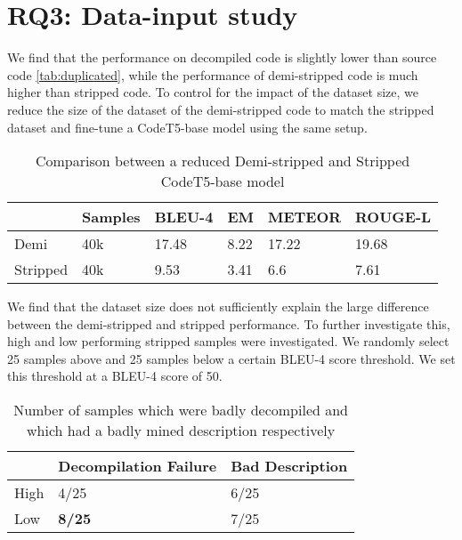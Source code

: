 
\section{RQ3: Data-input study}
We find that the performance on decompiled code is slightly lower than source code \ref{tab:duplicated}, while the performance of demi-stripped code is much higher than stripped code. To control for the impact of the dataset size, we reduce the size of the dataset of the demi-stripped code to match the stripped dataset and fine-tune a CodeT5-base model using the same setup.
\label{tab:demiSize}
\begin{table}[!h]
\centering
\begin{tabular}{llllll} 
\hline
\rowcolor[rgb]{0.729,0.729,0.729} \multicolumn{1}{|l}{\textbf{}} & Samples & BLEU-4 & EM   & METEOR & \multicolumn{1}{l|}{ROUGE-L}  \\ 
\hline
Demi                                                             & 40k     & 17.48  & 8.22 & 17.22  &  19.68                             \\
Stripped                                                         & 40k     & 9.53   & 3.41 & 6.6  &  7.61                            
\end{tabular}
\caption{Comparison between a reduced Demi-stripped and Stripped CodeT5-base model}
\end{table}

We find that the dataset size does not sufficiently explain the large difference between the demi-stripped and stripped performance. To further investigate this, high and low performing stripped samples were investigated. We randomly select 25 samples above and 25 samples below a certain BLEU-4 score threshold. We set this threshold at a BLEU-4 score of 50.

\label{tab:manual}
\begin{table}[!h]
\centering
\begin{tabular}{lll}
\hline
\rowcolor[HTML]{C0C0C0} 
\multicolumn{1}{|l}{\cellcolor[HTML]{C0C0C0}\textbf{}} & Decompilation Failure & \multicolumn{1}{l|}{\cellcolor[HTML]{C0C0C0}Bad Description} \\ \hline
High                                                   & 4/25                     & 6/25                                                            \\
Low                                                    & \textbf{8/25}                     & 7/25                                                           
\end{tabular}
\caption{Number of samples which were badly decompiled and which had a badly mined description respectively}
\end{table}

